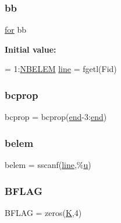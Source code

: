 \subsubsection{\texorpdfstring{bb}{bb}}
{\footnotesize\ttfamily \hyperlink{a00623_ad1e7380d51df1e0043d24d3c8a860e0a}{for} bb}

{\bfseries Initial value\+:}
\begin{DoxyCode}
= 1:\hyperlink{a00608_a20507c612303aa48d9e49883e863fa60}{NBELEM}
        \hyperlink{a00608_a1d1b0d42391bd99b4214d9216b163807}{line} = fgetl(Fid)
\end{DoxyCode}
\mbox{\label{a00608_aeb3bba3f2a1cac40e67dcec5c4faf3d8}} 
\subsubsection{\texorpdfstring{bcprop}{bcprop}}
{\footnotesize\ttfamily bcprop = bcprop(\hyperlink{a00608_afb358f48b1646c750fb9da6c6585be2b}{end}-\/3\+:\hyperlink{a00608_afb358f48b1646c750fb9da6c6585be2b}{end})}

\mbox{\label{a00608_abb20825a1a6ea12717847b56b3231c6a}} 
\subsubsection{\texorpdfstring{belem}{belem}}
{\footnotesize\ttfamily belem = sscanf(\hyperlink{a00608_a1d1b0d42391bd99b4214d9216b163807}{line},\textquotesingle{}\%\hyperlink{a00605_a6277e2a7446059985dc9bcf0a4ac1a8f}{u}\textquotesingle{})}

\mbox{\label{a00608_a3ae52850c5599fbb0af6b0dbf49b63a1}} 
\subsubsection{\texorpdfstring{B\+F\+L\+AG}{BFLAG}}
{\footnotesize\ttfamily B\+F\+L\+AG = zeros(\hyperlink{a00608_a16e4ef534cec559430e07e05eb71c719}{K},4)}

